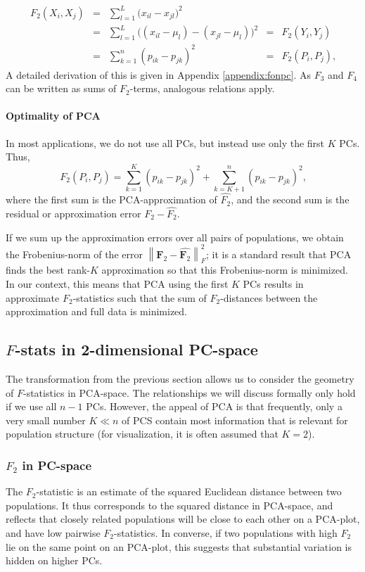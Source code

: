 \documentclass[12pt,a4pape, fullpage]{article}
\newcommand{\normsq}[1]{\left\lVert#1\right\rVert^2}
\newcommand{\MF}{\mathbf{F}_2} %
\begin{document}
\begin{align}
F_2(X_i, X_j) &=&  \sum_{l=1}^L \big( x_{il} -x_{jl}\big)^2  &&\nonumber\\ 
 &=& \sum_{l=1}^L \big( (x_{il} - \mu_l) -(x_{jl} -\mu_l)\big)^2   &=& F_2(Y_i, Y_j) \nonumber\\
 &=& \sum_{k=1}^n (p_{ik} - p_{jk})^2  &=& F_2(P_i, P_j) \text{,}
\end{align}
A detailed derivation of this is given in Appendix \ref{appendix:fonpc}.
As $F_3$ and $F_4$ can be written as sums of $F_2$-terms, analogous relations apply.

\paragraph{Optimality of PCA}
In most applications, we do not use all PCs, but instead use only the first $K$ PCs.
Thus, 
\begin{equation}
F_2(P_i, P_j) = \sum_{k=1}^K(p_{ik} - p_{jk})^2 + \sum_{k=K+1}^n(p_{ik} - p_{jk})^2 \text{,}
\end{equation}
where the first sum is the PCA-approximation of $\hat{F_2}$, and the second sum is the residual or approximation error $F_2 - \hat{F_2}$.

If we sum up the approximation errors over all pairs of populations, we obtain the Frobenius-norm of the error $\normsq{\MF - \hat{\MF}}_F$; it is a standard result that PCA finds the best rank-$K$ approximation so that this Frobenius-norm is minimized. In our context, this means that PCA using the first $K$ PCs results in approximate $F_2$-statistics such that the sum of $F_2$-distances between the approximation and full data is minimized.



\subsection{$F$-stats in 2-dimensional PC-space}
The transformation from the previous section allows us to consider the geometry
of $F$-statistics in PCA-space. The relationships we will discuss formally only
hold if we use all $n-1$ PCs. However, the appeal of PCA is that frequently,
only a very small number $K \ll n$ of PCS contain most information that is
relevant for population structure (for visualization, it is often assumed that
$K=2$).

\subsubsection{$F_2$ in PC-space}
The $F_2$-statistic is an estimate of the squared Euclidean distance between two
populations. It thus corresponds to the squared distance in PCA-space, and
reflects that closely related populations  will be close to each other on a
PCA-plot, and have low pairwise $F_2$-statistics. In converse, if two
populations with high $F_2$ lie on the same point on an PCA-plot, this suggests
that substantial variation is hidden on higher PCs.
\end{document}

